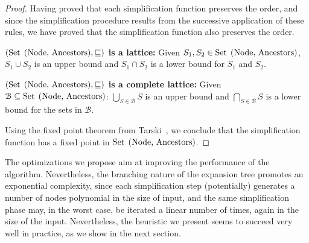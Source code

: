 \begin{proof}
	Having proved
	that each simplification function preserves the order, and
	since the simplification procedure results from the successive 
	application of these rules, we have proved that the simplification
	function also preserves the order.\smallskip
	
	\noindent\textbf{$(\text{\lstinline{Set (Node, Ancestors)}}, \leqSets)$
	is a lattice:} Given 
	$S_1, S_2\in \text{\lstinline{Set (Node, Ancestors)}}$,
	$S_1 \cup S_2$ is an upper bound and
	$S_1 \cap S_2$ is a lower bound for $S_1$ and $S_2$.\smallskip
	
	\noindent\textbf{$(\text{\lstinline{Set (Node, Ancestors)}}, \leqSets)$
	is a complete lattice:} Given 
	$\mathcal{B}\subseteq \text{\lstinline{Set (Node, Ancestors)}}$:
	$\bigcup_{S\in \mathcal{B}} S$ is an upper bound and
	$\bigcap_{S\in \mathcal{B}} S$ is a lower bound for the sets in 
	$\mathcal{B}$.
	
	Using the fixed point theorem from Tarski~\cite{tarski1955lattice}, 
	we conclude that the simplification function has a
	fixed point in $\text{\lstinline{Set (Node, Ancestors)}}$.
\end{proof}

The optimizations we propose aim at improving the performance of the
algorithm. Nevertheless, the branching nature of the expansion tree
promotes an exponential complexity, since each simplification step
(potentially) generates a number of nodes polynomial in the size of
input, and the same simplification phase may, in the worst case, be
iterated a linear number of times, again in the size of the input.
Nevertheless, the heuristic we present seems to succeed very well in
practice, as we show in the next section.


